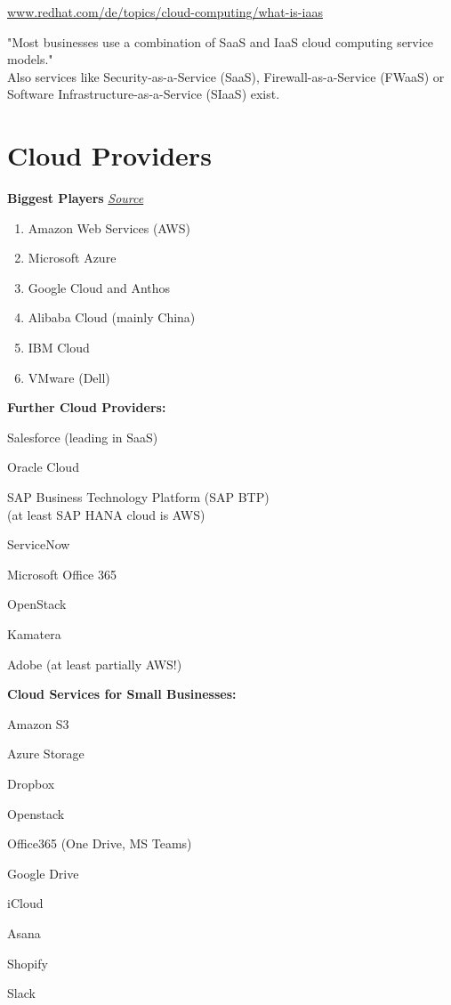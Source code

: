 \documentclass[12pt]{article}
\begin{document}
\begin{center}
    \url{www.redhat.com/de/topics/cloud-computing/what-is-iaas}
\end{center}
"Most businesses use a combination of SaaS and IaaS cloud computing service models." \\
Also services like Security-as-a-Service (SaaS), Firewall-as-a-Service (FWaaS) or Software Infrastructure-as-a-Service (SIaaS) exist.

\section*{Cloud Providers} 
\textbf{Biggest Players} \hspace{11cm} \href{https://www.zdnet.com/article/the-top-cloud-providers-of-2021-aws-microsoft-azure-google-cloud-hybrid-saas/}{\textit{Source}}
\begin{enumerate}
    \item Amazon Web Services (AWS)
    \item Microsoft Azure
    \item Google Cloud and Anthos
    \item Alibaba Cloud (mainly China)
    \item IBM Cloud
    \item VMware (Dell)
\end{enumerate}
\textbf{Further Cloud Providers:}
\begin{itemize}
    \begin{multicols}{2}
        \item Salesforce (leading in SaaS)
        \item Oracle Cloud
        \item SAP Business Technology Platform (SAP BTP) \\
        (at least SAP HANA cloud is AWS)
        \item ServiceNow
        \item Microsoft Office 365
        \item OpenStack
        \item Kamatera
        \item Adobe (at least partially AWS!)
    \end{multicols}
\end{itemize}
\textbf{Cloud Services for Small Businesses:}
\begin{itemize}
    \begin{multicols}{2}
        \item Amazon S3
        \item Azure Storage
        \item Dropbox
        \item Openstack
        \item Office365 (One Drive, MS Teams)
        \item Google Drive
        \item iCloud
        \item Asana
        \item Shopify
        \item Slack
    \end{multicols}
\end{itemize}
\end{document}
